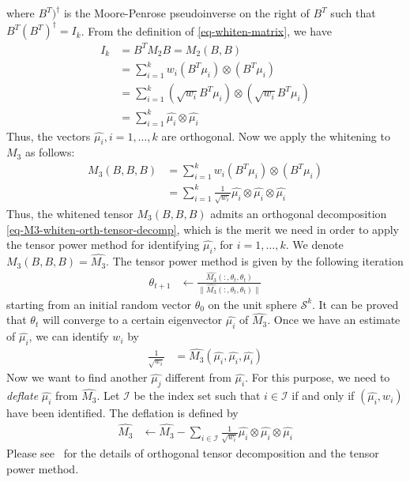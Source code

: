 \documentclass{article}
\begin{document}
where $B^{T})^{\dagger}$ is the Moore-Penrose pseudoinverse on the right of $B^{T}$ such that $B^{T}(B^{T})^{\dagger}=I_k$. From the definition of \eqref{eq-whiten-matrix}, we have
\begin{align}
I_k&=B^{T}M_2 B=M_2(B,B)\\
&=\sum_{i=1}^k w_i (B^{T}\mu_i)\otimes (B^{T}\mu_i)\\
&=\sum_{i=1}^k (\sqrt{w_i}B^{T}\mu_i)\otimes (\sqrt{w_i}B^{T}\mu_i)\\
&=\sum_{i=1}^k \widehat{\mu_i}\otimes \widehat{\mu_i}
\end{align}
Thus, the vectors $\widehat{\mu_i},i=1,\ldots,k$ are orthogonal. Now we apply the whitening to $M_3$ as follows:
\begin{align}
M_3(B,B,B)&=\sum_{i=1}^k w_i (B^{T}\mu_i)\otimes (B^{T}\mu_i)\\
&=\sum_{i=1}^k \frac{1}{\sqrt{w_i}} \widehat{\mu_i}\otimes \widehat{\mu_i}\otimes \widehat{\mu_i}
\label{eq-M3-whiten-orth-tensor-decomp}
\end{align}
Thus, the whitened tensor $M_3(B,B,B)$ admits an orthogonal decomposition \eqref{eq-M3-whiten-orth-tensor-decomp}, which is the merit we need in order to apply the tensor power method for identifying $\widehat{\mu_i}$, for $i=1,\ldots,k$. We denote $M_3(B,B,B)=\widehat{M_3}$. The tensor power method is given by the following iteration
\begin{align}
\theta_{t+1} & \leftarrow \frac{\widehat{M_3}(:,\theta_{t}, \theta_{t})}{\|\widehat{M_3}(:,\theta_{t}, \theta_{t})\|}
\label{eq-tensor-power-iter}
\end{align}
starting from an initial random vector $\theta_0$ on the unit sphere $\mathcal{S}^{k}$. It can be proved that $\theta_t$ will converge to a certain eigenvector $\widehat{\mu_i}$ of $\widehat{M_3}$. Once we have an estimate of $\widehat{\mu_i}$, we can identify $w_i$ by
\begin{align}
\frac{1}{\sqrt{w_i}}&=\widehat{M_3}(\widehat{\mu_i},\widehat{\mu_i},\widehat{\mu_i})
\label{eq-wi-estimate}
\end{align}
Now we want to find another $\widehat{\mu_j}$ different from $\widehat{\mu_i}$. For this purpose, we need to \textit{deflate} $\widehat{\mu_i}$ from $\widehat{M_3}$. Let $\mathcal{I}$ be the index set such that $i\in \mathcal{I}$ if and only if $(\widehat{\mu_i}, w_i)$ have been identified. The deflation is defined by
\begin{align}
\widehat{M_3} &\leftarrow \widehat{M_3} - \sum_{i\in \mathcal{I}}\frac{1}{\sqrt{w_i}} \widehat{\mu_i}\otimes \widehat{\mu_i} \otimes \widehat{\mu_i}
\label{eq-deflation}
\end{align}
Please see~\cite{AnandkumarG2014} for the details of orthogonal tensor decomposition and the tensor power method.
\end{document}
